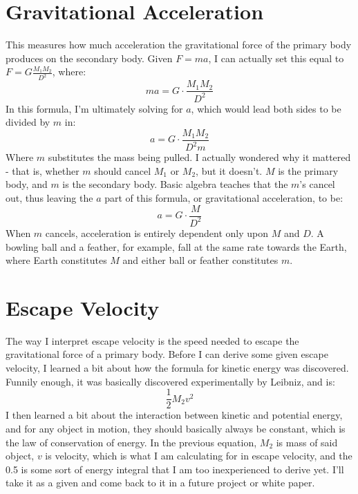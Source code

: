 \documentclass[12pt]{article}
\begin{document}
\section{Gravitational Acceleration}
This measures how much acceleration the gravitational force of the primary body produces on the secondary body. Given $F = ma$, I can actually set this equal to 
$F = G \frac{M_1 M_2}{D^2}$, where: $$ma = G \cdot \frac{M_1 M_2}{D^2}$$ 
In this formula, I'm ultimately solving for $a$, which would lead both sides to be divided by $m$ in: $$a = G \cdot \frac{M_1 M_2}{D^2 m}$$ 
Where $m$ substitutes the mass being pulled. I actually wondered why it mattered - that is, whether $m$ should cancel $M_1$ or $M_2$, 
but it doesn't. $M$ is the primary body, and $m$ is the secondary body. Basic algebra teaches that the $m$'s cancel out, thus leaving the $a$ part of this formula, 
or gravitational acceleration, to be: $$ a = G \cdot \frac{M}{D^2}$$ When $m$ cancels, acceleration is entirely dependent only upon $M$ and $D$. A bowling ball and a 
feather, for example, fall at the same rate towards the Earth, where Earth constitutes $M$ and either ball or feather constitutes $m$.

\section{Escape Velocity}
The way I interpret escape velocity is the speed needed to escape the gravitational force of a primary body. Before I can derive some given escape velocity, I 
learned a bit about how the formula for kinetic energy was discovered. Funnily enough, it was basically discovered experimentally by Leibniz, and is:
$$\frac{1}{2}M_2v^2$$
I then learned a bit about the interaction between kinetic and potential energy, and for any object in motion, they should basically always be constant,
which is the law of conservation of energy. In the previous equation, $M_2$ is mass of said object, $v$ is velocity, which is what I am calculating for in escape velocity, and
the 0.5 is some sort of energy integral that I am too inexperienced to derive yet. I'll take it as a given and come back to it in a future project or white paper.
\end{document}
